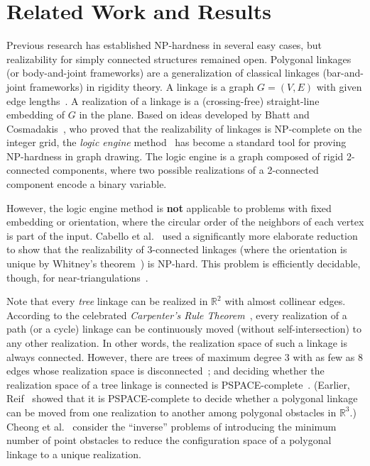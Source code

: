 \documentclass[10pt]{CSUNthesis}
\theoremstyle{plain}%
\theoremstyle{definition}
\theoremstyle{remark}
\newcommand{\RR}{\mathbb{R}} %
\begin{document}
\section{Related Work and Results}
Previous research has established NP-hardness in several easy cases, but realizability for simply connected structures remained open. Polygonal linkages (or body-and-joint frameworks) are a generalization of classical linkages (bar-and-joint frameworks) in rigidity theory. A linkage is a graph $G=(V,E)$ with given edge lengths~\cite{CD-ch9}. A realization of a linkage is a (crossing-free) straight-line embedding of $G$ in the plane. Based on ideas developed by Bhatt and Cosmadakis~\cite{BC87}, who proved that the realizability of linkages is NP-complete on the integer grid, the \emph{logic engine} method~\cite{BET+99,EW96,FHW97,HK01} has become a standard tool for proving NP-hardness in graph drawing. The logic engine is a graph composed of rigid 2-connected components, where two possible realizations of a 2-connected component encode a binary variable.

However, the logic engine method is \textbf{not} applicable to problems with fixed embedding or orientation, where the circular order of the neighbors of each vertex is part of the input. Cabello et al.~\cite{CDR07,EW90} used a significantly more elaborate reduction to show that the realizability of 3-connected linkages (where the orientation is unique by Whitney's theorem~\cite{W33}) is NP-hard. This problem is efficiently decidable, though, for near-triangulations~\cite{CDR07,BV96}.

Note that every \emph{tree} linkage can be realized in $\RR^2$ with almost collinear edges. According to the celebrated \emph{Carpenter's Rule Theorem}~\cite{CDR03,Str05}, every realization of a path (or a cycle) linkage can be continuously moved (without self-intersection) to any other realization. In other words, the realization space of such a linkage is always connected. However, there are trees of maximum degree 3 with as few as 8 edges whose realization space is disconnected~\cite{BCD+09}; and deciding whether the realization space of a tree linkage is connected is PSPACE-complete~\cite{AKR+04}.
(Earlier, Reif~\cite{Rei79} showed that it is PSPACE-complete to decide whether a polygonal linkage can be moved from one realization to another among polygonal obstacles in $\RR^3$.)
Cheong et al.~\cite{CdG+07} consider the ``inverse'' problems of introducing the minimum number of point obstacles to reduce the configuration space of a polygonal linkage to a unique realization.
\end{document}
